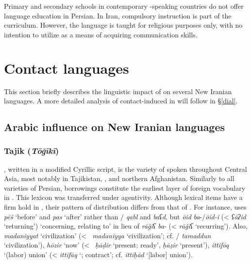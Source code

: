 \documentclass[output=paper]{langsci/langscibook}
\begin{document}
Primary and secondary schools in contemporary -speaking countries do not offer language education in Persian. In Iran, compulsory   instruction is part of the curriculum. However, the language is taught for religious purposes only, with no intention to utilize  as a means of acquiring communication skills.

\section{Contact languages}

This section briefly describes the linguistic impact of   on several New Iranian languages. A more detailed analysis of contact-induced  in  will follow in §\ref{dial}.

\subsection{Arabic influence on New Iranian languages}

\subsubsection{Tajik (\textit{Tōǧīkī})}

, written in a modified Cyrillic script, is the variety of  spoken throughout Central Asia, most notably in Tajikistan, , and northern Afghanistan. Similarly to all varieties of Persian,  borrowings constitute the earliest layer of foreign vocabulary in  \citep{Perry2009}. This lexicon was transferred under  agentivity. Although  lexical items have a firm hold in , their pattern of distribution differs from that of . For instance,  uses \textit{pēš} ‘before’ and \textit{pas} ‘after’ rather than / \textit{qabl} and \textit{baʕd}, but \textit{ōid} \textit{ba}{}-/\textit{ōid-i} (<  \textit{ʕāʔid} ‘returning’) ‘concerning, relating to’ in lieu of  \textit{rāǧiʕ} \textit{ba}{}- (<  \textit{rāǧiʕ} ‘recurring’). Also, \textit{madaniyyat} ‘civilization’ (<~ \textit{madaniyya} ‘civilization’; cf. / \textit{tamaddun} ‘civilization’), \textit{hōzir} ‘now’ (<~ \textit{ḥāḍir} ‘present; ready’,  \textit{ḥāẓir} ‘present’), \textit{ittifōq} ‘(labor) union’ (<  \textit{ittifāq} ‘; contract’; cf.   \textit{ittiḥād} ‘[labor] union’).
\end{document}

